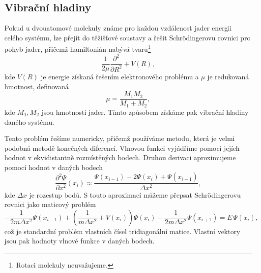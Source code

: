 \subsection{Vibrační hladiny}
\label{te_vibr}
Pokud u dvouatomové molekuly známe pro každou vzdálenost jader energii celého systému, lze přejít do těžišťové soustavy a řešit Schrödingerovu rovnici pro pohyb jader,
přičemž hamiltonián nabývá tvaru\footnote{Rotaci molekuly neuvažujeme.}
\begin{equation}
\frac{1}{2\mu}\frac{\partial^2}{\partial R^2} + V(R),
\end{equation}
kde $V(R)$ je energie získaná řešením elektronového problému a $\mu$ je redukovaná hmotnost, definovaná
\begin{equation}
\mu = \frac{M_1M_2}{M_1+M_2},
\end{equation}
kde $M_1, M_2$ jsou hmotnosti jader. 
Tímto způsobem získáme pak vibrační hladiny daného systému.

Tento problém řešíme numericky, přičemž používáme
metodu, která je velmi podobná metodě konečných diferencí.
Vlnovou funkci vyjádříme pomocí jejích hodnot v ekvidistantně rozmístěných bodech.
Druhou derivaci aproximujeme pomocí hodnot v daných bodech
\begin{equation}
\frac{\partial^2 \Psi}{\partial x^2}(x_i) \approx \frac{\Psi(x_{i-1})-2\Psi(x_i)+
\Psi(x_{i+1})}{\Delta x^2},
\end{equation}
kde $\Delta x$ je rozestup bodů.
S touto aproximací můžeme přepsat Schrödingerovu rovnici jako maticový problém
\begin{equation}
-\frac{1}{2m\Delta x^2} \Psi(x_{i-1}) 
+ \left(\frac{1}{m\Delta x^2}+V(x_i)\right) \Psi(x_i)
-\frac{1}{2m\Delta x^2} \Psi(x_{i+1}) = E\,\Psi(x_i),
\end{equation}
což je standardní problém vlastních čísel tridiagonální matice.
Vlastní vektory jsou pak hodnoty vlnové funkce v daných bodech.
